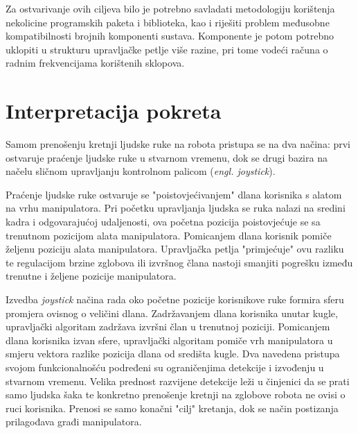 \documentclass[times, utf8, diplomski, numeric]{fer}
\begin{document}
Za ostvarivanje ovih ciljeva bilo je potrebno savladati metodologiju korištenja nekolicine programskih paketa i biblioteka, kao i riješiti problem međusobne kompatibilnosti brojnih komponenti sustava.
Komponente je potom potrebno uklopiti u strukturu upravljačke petlje više razine, pri tome vodeći računa o radnim frekvencijama korištenih sklopova.


\section{Interpretacija pokreta}\label{2_1}
Samom prenošenju kretnji ljudske ruke na robota pristupa se na dva načina: prvi ostvaruje praćenje ljudske ruke u stvarnom vremenu, dok se drugi bazira na načelu sličnom upravljanju kontrolnom palicom (\textit{engl. joystick}).

Praćenje ljudske ruke ostvaruje se "poistovjećivanjem" dlana korisnika s alatom na vrhu manipulatora. 
Pri početku upravljanja ljudska se ruka nalazi na sredini kadra i odgovarajućoj udaljenosti, ova početna pozicija poistovjećuje se sa trenutnom pozicijom alata manipulatora.
Pomicanjem dlana korisnik pomiče željenu poziciju alata manipulatora.
Upravljačka petlja "primjećuje" ovu razliku te regulacijom brzine zglobova ili izvršnog člana nastoji smanjiti pogrešku između trenutne i željene pozicije manipulatora.

Izvedba \textit{joystick} načina rada oko početne pozicije korisnikove ruke formira sferu promjera ovisnog o veličini dlana.
Zadržavanjem dlana korisnika unutar kugle, upravljački algoritam zadržava izvršni član u trenutnoj poziciji.
Pomicanjem dlana korisnika izvan sfere, upravljački algoritam pomiče vrh manipulatora u smjeru vektora razlike pozicija dlana od središta kugle.
Dva navedena pristupa svojom funkcionalnošću podređeni su ograničenjima detekcije i izvođenju u stvarnom vremenu.
Velika prednost razvijene detekcije leži u činjenici da se prati samo ljudska šaka te konkretno prenošenje kretnji na zglobove robota ne ovisi o ruci korisnika.
Prenosi se samo konačni "cilj" kretanja, dok se način postizanja prilagođava građi manipulatora.
\end{document}
